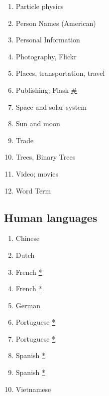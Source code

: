 \documentclass[conference,10pt]{IEEEtran}
\begin{document}
\begin{figure}[H]
\begin{multicols}{2}
\begin{enumerate}
    \item Particle physics
    \item Person Names (American)
    \item Personal Information
    \item Photography, Flickr
    \item Places, transportation, travel
    \item Publishing; Flask \hyperref[dual]{\#}
    \item Space and solar system
    \item Sun and moon
    \item Trade
    \item Trees, Binary Trees
    \item Video; movies
    \item Word Term
    \setcounter{topics}{\value{enumi}}
 \end{enumerate}
 \end{multicols}
 \subsection{Human languages}
 \begin{multicols}{2}
 \begin{enumerate}
    \setcounter{enumi}{\value{topics}}
    \item Chinese
    \item Dutch
    \item French \hyperref[duplicate]{*}
    \item French \hyperref[duplicate]{*}
    \item German
    \item Portuguese \hyperref[duplicate]{*}
    \item Portuguese \hyperref[duplicate]{*}
    \item Spanish \hyperref[duplicate]{*}
    \item Spanish \hyperref[duplicate]{*}
    \item Vietnamese
    \setcounter{topics}{\value{enumi}}
 \end{enumerate}
 \end{multicols}

\end{figure}
\end{document}
